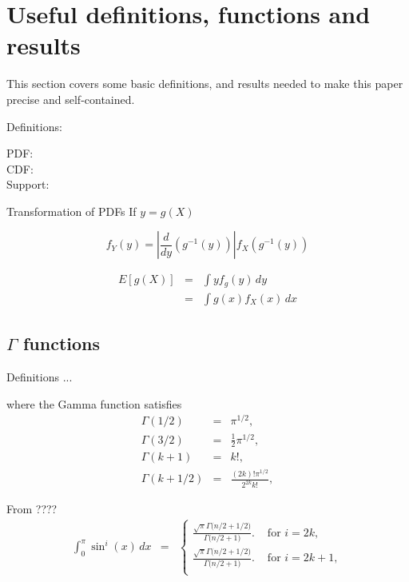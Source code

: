 \section{Useful definitions, functions and results}
\label{sec:useful}

This section covers some basic definitions, and results needed to make
this paper precise and self-contained.

Definitions:
\begin{description}

\item[PDF:] 

\item[CDF:]

\item[Support:]

\end{description}


Transformation of PDFs
If $y = g(X)$

\[ f_Y(y) = \left| \frac{d}{dy} \left( g^{-1}(y) \right) \right|
               f_X\left( g^{-1}(y) \right)
\]


\begin{eqnarray}
 E[ g(X) ] & = & \int y f_g (y) \, dy \\
           & = & \int g(x) f_X(x) \, dx 
\end{eqnarray}




\subsection{$\Gamma$ functions}

Definitions ...


where the Gamma function satisfies\cite[6.1.12]{Abramowitz_and_Stegun}
\begin{eqnarray}
 \label{eq:gamma}
 \Gamma(1/2) & = & \pi^{1/2}, \\
 \Gamma(3/2) & = & \frac{1}{2} \pi^{1/2}, \\
 \Gamma(k+1) & = & k!, \\
 \Gamma(k+1/2) & = & \frac{(2k)! \pi^{1/2}}{2^{2k} k!},
\end{eqnarray}



From ????
\begin{eqnarray}
  \int_0^{\pi} \sin^i(x) \, dx
    & = & \left\{ \begin{array}{ll}
        \displaystyle
      \frac{\sqrt{\pi} \Gamma\big( n/2 + 1/2 \big)}{\Gamma\big( n/2+1 \big)}.
      & \mbox{ for } i = 2k, \\
        \displaystyle
      \frac{\sqrt{\pi} \Gamma\big( n/2 + 1/2 \big)}{\Gamma\big( n/2+1 \big)}.
      & \mbox{ for } i = 2k+1, \\
           \end{array} \right. \nonumber \\
\end{eqnarray}



